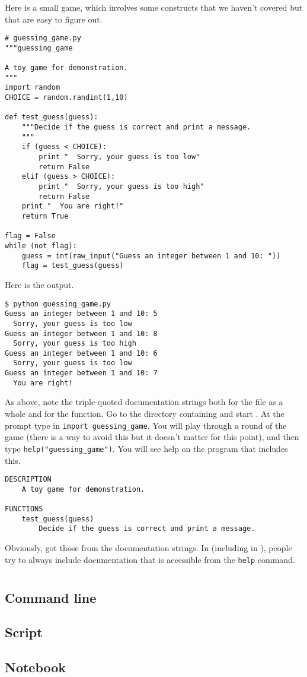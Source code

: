 Here is a small game, which involves some \python{} constructs that
we haven't covered but that are easy to figure out.
\begin{lstlisting}[style=python]
# guessing_game.py
"""guessing_game

A toy game for demonstration.
"""
import random
CHOICE = random.randint(1,10)

def test_guess(guess):
    """Decide if the guess is correct and print a message.
    """
    if (guess < CHOICE):
        print "  Sorry, your guess is too low"
        return False
    elif (guess > CHOICE):
        print "  Sorry, your guess is too high"
        return False
    print "  You are right!"
    return True

flag = False
while (not flag):
    guess = int(raw_input("Guess an integer between 1 and 10: "))
    flag = test_guess(guess)
\end{lstlisting}
Here is the output.
\begin{lstlisting}
$ python guessing_game.py
Guess an integer between 1 and 10: 5
  Sorry, your guess is too low
Guess an integer between 1 and 10: 8
  Sorry, your guess is too high
Guess an integer between 1 and 10: 6
  Sorry, your guess is too low
Guess an integer between 1 and 10: 7
  You are right!
\end{lstlisting}  %

As above, note the triple-quoted documentation strings both for the 
file as a whole and for the function.
Go to the directory containing  and start \python{}.
At the prompt type in \lstinline[style=inline]!import guessing_game!.
You will play through a round of the game (there is a way to avoid this
but it doesn't matter for this point), and then type
\lstinline[style=inline]!help("guessing_game")!.
You will see help on the program that includes this.
\begin{lstlisting}
DESCRIPTION
    A toy game for demonstration.

FUNCTIONS
    test_guess(guess)
        Decide if the guess is correct and print a message. 
\end{lstlisting}
Obviously, \python{} got those from the documentation strings.
In \python{} (including in \sage), people try to always include documentation
that is accessible from the \lstinline[style=inline]!help! command.


\section{\sage}

\subsection{Command line}

\subsection{Script}

\subsection{Notebook}

\endinput